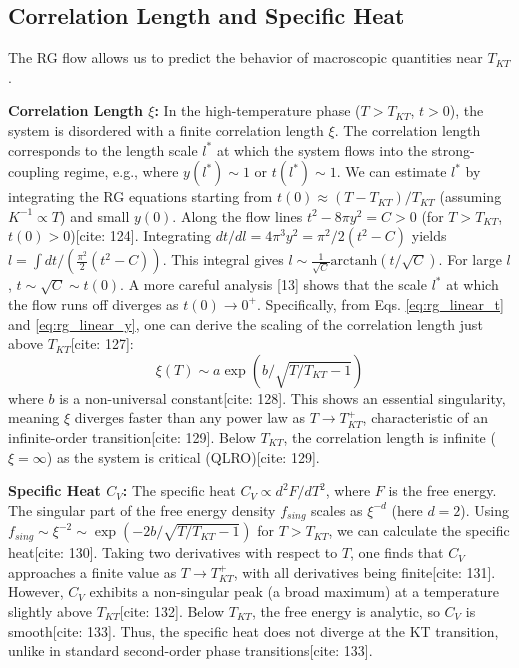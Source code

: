 \documentclass[11pt]{article}
\begin{document}
\subsection{Correlation Length and Specific Heat}

The RG flow allows us to predict the behavior of macroscopic quantities near $T_{KT}$.

\textbf{Correlation Length $\xi$:}
In the high-temperature phase ($T > T_{KT}$, $t > 0$), the system is disordered with a finite correlation length $\xi$. The correlation length corresponds to the length scale $l^*$ at which the system flows into the strong-coupling regime, e.g., where $y(l^*) \sim 1$ or $t(l^*) \sim 1$. We can estimate $l^*$ by integrating the RG equations starting from $t(0) \approx (T - T_{KT})/T_{KT}$ (assuming $K^{-1} \propto T$) and small $y(0)$.
Along the flow lines $t^2 - 8\pi y^2 = C > 0$ (for $T > T_{KT}$, $t(0)>0$)[cite: 124]. Integrating $dt/dl = 4\pi^3 y^2 = \pi^2/2 (t^2 - C)$ yields $l = \int dt / (\frac{\pi^2}{2} (t^2 - C))$. This integral gives $l \sim \frac{1}{\sqrt{C}} \text{arctanh}(t/\sqrt{C})$. For large $l$, $t \sim \sqrt{C} \sim t(0)$. A more careful analysis [13] shows that the scale $l^*$ at which the flow runs off diverges as $t(0) \to 0^+$.
Specifically, from Eqs. \eqref{eq:rg_linear_t} and \eqref{eq:rg_linear_y}, one can derive the scaling of the correlation length just above $T_{KT}$[cite: 127]:
\begin{equation}
\xi(T) \sim a \exp(b / \sqrt{T/T_{KT} - 1}) \label{eq:xi_KT}
\end{equation}
where $b$ is a non-universal constant[cite: 128]. This shows an essential singularity, meaning $\xi$ diverges faster than any power law as $T \to T_{KT}^+$, characteristic of an infinite-order transition[cite: 129]. Below $T_{KT}$, the correlation length is infinite ($\xi = \infty$) as the system is critical (QLRO)[cite: 129].

\textbf{Specific Heat $C_V$:}
The specific heat $C_V \propto d^2 F / dT^2$, where $F$ is the free energy. The singular part of the free energy density $f_{sing}$ scales as $\xi^{-d}$ (here $d=2$). Using $f_{sing} \sim \xi^{-2} \sim \exp(-2b / \sqrt{T/T_{KT} - 1})$ for $T > T_{KT}$, we can calculate the specific heat[cite: 130]. Taking two derivatives with respect to $T$, one finds that $C_V$ approaches a finite value as $T \to T_{KT}^+$, with all derivatives being finite[cite: 131]. However, $C_V$ exhibits a non-singular peak (a broad maximum) at a temperature slightly above $T_{KT}$[cite: 132]. Below $T_{KT}$, the free energy is analytic, so $C_V$ is smooth[cite: 133]. Thus, the specific heat does not diverge at the KT transition, unlike in standard second-order phase transitions[cite: 133].
\end{document}
